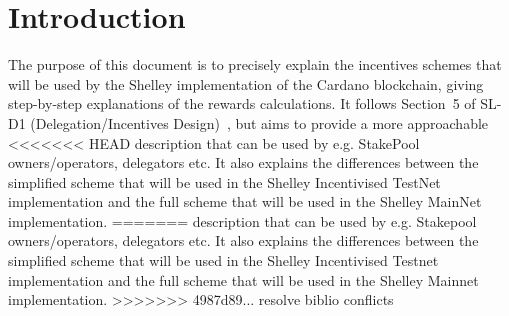 \documentclass[11pt,a4paper,dvipsnames,twosided,final]{article}
\newcommand{\cardano}[1]{Cardano}
\begin{document}
\thispagestyle{empty}
\clearpage
\pagestyle{myheadings}
\renewcommand{\thepage}{\arabic{page}}
\setcounter{page}{1}
\section{Introduction}
\label{sec:introduction}

The purpose of this document is to precisely explain the incentives schemes that will be used by the Shelley implementation
of the \cardano{} blockchain, giving step-by-step explanations of the rewards calculations.
It follows Section~5 of SL-D1 (Delegation/Incentives Design)~\cite{delegation_design}, but aims to provide a more approachable
<<<<<<< HEAD
description that can be used by e.g. StakePool owners/operators, delegators etc.
It also explains the differences between the simplified scheme that will be used in the Shelley Incentivised TestNet implementation and the
full scheme that will be used in the Shelley MainNet implementation.
=======
description that can be used by e.g. Stakepool owners/operators, delegators etc.
It also explains the differences between the simplified scheme that will be used in the Shelley Incentivised Testnet implementation and the
full scheme that will be used in the Shelley Mainnet implementation.
>>>>>>> 4987d89... resolve biblio conflicts
\end{document}
